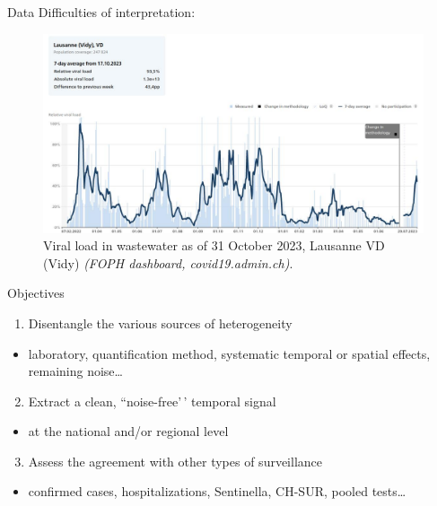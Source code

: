 \documentclass[
  ignorenonframetext,
]{beamer}
\providecommand{\tightlist}{%
  \setlength{\itemsep}{0pt}\setlength{\parskip}{0pt}}
\begin{document}
\begin{frame}{Data}
\protect\hypertarget{data-5}{}
Difficulties of \alert{interpretation}:

\begin{figure}
\centering
\includegraphics[width=.9\linewidth]{figures/lausanne}
\caption{Viral load in wastewater as of 31 October 2023, Lausanne VD (Vidy) \textit{(FOPH dashboard, covid19.admin.ch)}.}
\end{figure}
\end{frame}

\begin{frame}{Objectives}
\protect\hypertarget{objectives}{}
\begin{enumerate}
\tightlist
\item
  Disentangle the \alert{various sources of heterogeneity}
\end{enumerate}

\begin{itemize}
\tightlist
\item
  laboratory, quantification method, systematic temporal or spatial
  effects, remaining noise\ldots{} \pause\bigskip
\end{itemize}

\begin{enumerate}
\setcounter{enumi}{1}
\tightlist
\item
  Extract a clean, ``noise-free'\,' \alert{temporal signal}
\end{enumerate}

\begin{itemize}
\tightlist
\item
  at the national and/or regional level \pause\bigskip
\end{itemize}

\begin{enumerate}
\setcounter{enumi}{2}
\tightlist
\item
  Assess the \alert{agreement} with other types of surveillance
\end{enumerate}

\begin{itemize}
\tightlist
\item
  confirmed cases, hospitalizations, Sentinella, CH-SUR, pooled
  tests\ldots{} \pause\bigskip
\end{itemize}
\end{frame}
\end{document}
